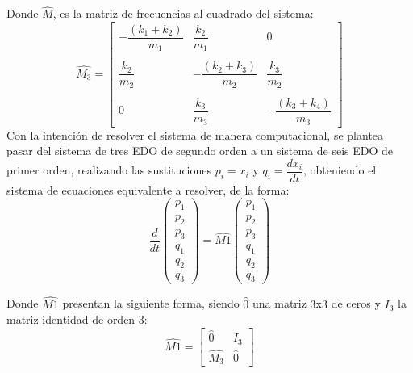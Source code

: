 \documentclass[11pt,letterpaper,twocolumn]{article}
\begin{document}
\par 
Donde $\hat{M}$, es la matriz de frecuencias al cuadrado del sistema: 
\[ \hat{M_{3}} = \left[
\begin{matrix}
-\dfrac{(k_{1}+k_{2})}{m_{1}} & \dfrac{k_{2}}{m_{1}} &  0 \\
\\
 \dfrac{k_{2}}{m_{2}} & -\dfrac{(k_{2}+k_{3})}{m_{2}} & \dfrac{k_{3}}{m_{2}}\\
\\
 0 &  \dfrac{k_{3}}{m_{3}} & -\dfrac{(k_{3}+k_{4})}{m_{3}}
\end{matrix} \right]
\]
Con la intención de resolver el sistema de manera computacional, se plantea pasar del sistema de tres EDO de segundo orden a un sistema de seis EDO de primer orden, realizando las sustituciones $p_{i}=x_{i}$ y $q_{i}=\dfrac{dx_{i}}{dt}$, obteniendo el sistema de ecuaciones equivalente a resolver, de la forma: 
\[
\dfrac{d}{dt} \left(
\begin{matrix}
p_{1}\\
p_{2}\\
p_{3}\\
q_{1}\\
q_{2}\\
q_{3}
\end{matrix} \right) = \hat{M1}  \left(
\begin{matrix}
p_{1}\\
p_{2}\\
p_{3}\\
q_{1}\\
q_{2}\\
q_{3}
\end{matrix} \right)
\] 
\par 
Donde $\hat{M1}$ presentan la siguiente forma, siendo $\hat{0}$ una matriz $3$x$3$ de ceros y $I_{3}$ la matriz identidad de orden $3$: 
\[ \hat{M1} = \left[
\begin{matrix}
\hat{0} &  I_{3}\\
\hat{M_{3}} & \hat{0}
\end{matrix}  \right]
\]
\end{document}
